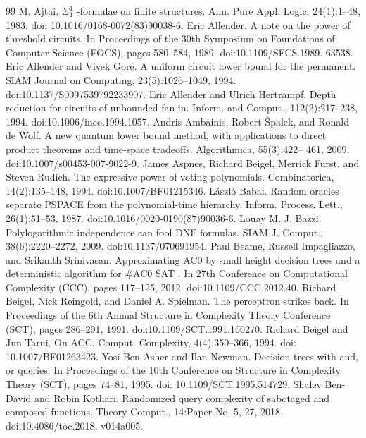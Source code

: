 \documentclass[10pt,a4paper]{article}
\begin{document}
\begin{thebibliography}{99}
 M. Ajtai. $\Sigma^1_1$ -formulae on finite structures. Ann. Pure Appl. Logic, 24(1):1–48, 1983. doi: 10.1016/0168-0072(83)90038-6.
 Eric Allender. A note on the power of threshold circuits. In Proceedings of the 30th Symposium on Foundations of Computer Science (FOCS), pages 580–584, 1989. doi:10.1109/SFCS.1989. 63538.
 Eric Allender and Vivek Gore. A uniform circuit lower bound for the permanent. SIAM Journal on Computing, 23(5):1026–1049, 1994. doi:10.1137/S0097539792233907.
 Eric Allender and Ulrich Hertrampf. Depth reduction for circuits of unbounded fan-in. Inform. and Comput., 112(2):217–238, 1994. doi:10.1006/inco.1994.1057.
 Andris Ambainis, Robert Špalek, and Ronald de Wolf. A new quantum lower bound method, with applications to direct product theorems and time-space tradeoffs. Algorithmica, 55(3):422– 461, 2009. doi:10.1007/s00453-007-9022-9.
 James Aspnes, Richard Beigel, Merrick Furst, and Steven Rudich. The expressive power of voting polynomials. Combinatorica, 14(2):135–148, 1994. doi:10.1007/BF01215346.
 László Babai. Random oracles separate PSPACE from the polynomial-time hierarchy. Inform. Process. Lett., 26(1):51–53, 1987. doi:10.1016/0020-0190(87)90036-6.
 Louay M. J. Bazzi. Polylogarithmic independence can fool DNF formulas. SIAM J. Comput., 38(6):2220–2272, 2009. doi:10.1137/070691954.
 Paul Beame, Russell Impagliazzo, and Srikanth Srinivasan. Approximating AC0 by small height decision trees and a deterministic algorithm for \#AC0 SAT . In 27th Conference on Computational Complexity (CCC), pages 117–125, 2012. doi:10.1109/CCC.2012.40.
 Richard Beigel, Nick Reingold, and Daniel A. Spielman. The perceptron strikes back. In Proceedings of the 6th Annual Structure in Complexity Theory Conference (SCT), pages 286–291, 1991. doi:10.1109/SCT.1991.160270.
 Richard Beigel and Jun Tarui. On ACC. Comput. Complexity, 4(4):350–366, 1994. doi: 10.1007/BF01263423.
 Yosi Ben-Asher and Ilan Newman. Decision trees with and, or queries. In Proceedings of the 10th Conference on Structure in Complexity Theory (SCT), pages 74–81, 1995. doi: 10.1109/SCT.1995.514729.
 Shalev Ben-David and Robin Kothari. Randomized query complexity of sabotaged and composed functions. Theory Comput., 14:Paper No. 5, 27, 2018. doi:10.4086/toc.2018. v014a005.

\end{thebibliography}
\end{document}
